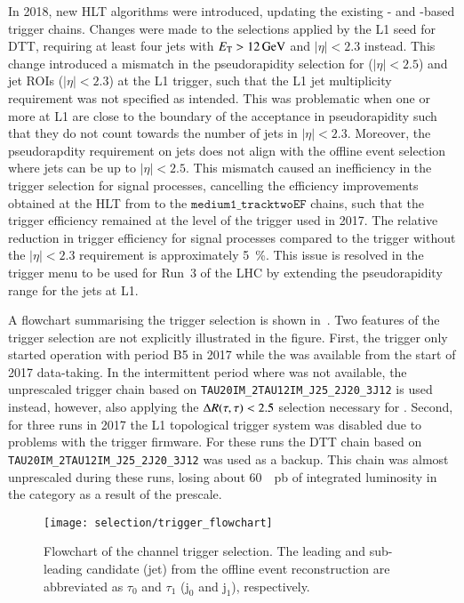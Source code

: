 In 2018, new \tauhadvis HLT algorithms were introduced, updating the
existing \LOneTopo- and \FourJTwelve-based trigger chains. Changes
were made to the selections applied by the \FourJTwelve L1 seed for
DTT, requiring at least four jets with $\ET > \SI{12}{\GeV}$ and
$|\eta| < 2.3$ instead. This change introduced a mismatch in the
pseudorapidity selection for \tauhadvis ($|\eta| < 2.5$) and jet ROIs
($|\eta| < 2.3$) at the L1 trigger, such that the L1 jet multiplicity
requirement was not specified as intended. This was problematic when
one or more \tauhadvis at L1 are close to the boundary of the
acceptance in pseudorapidity such that they do not count towards the
number of jets in $|\eta| < 2.3$. Moreover, the pseudorapdity
requirement on jets does not align with the offline event selection
where jets can be \btagged up to $|\eta| < 2.5$. This mismatch caused
an inefficiency in the trigger selection for signal processes,
cancelling the efficiency improvements obtained at the HLT from to the
$\texttt{medium1\_tracktwoEF}$ chains, such that the trigger
efficiency remained at the level of the \FourJTwelve trigger used in
2017. The relative reduction in trigger efficiency for signal
processes compared to the \FourJTwelve trigger without the
$|\eta| < 2.3$ requirement is approximately \SI{5}{\percent}. This
issue is resolved in the trigger menu to be used for Run~3 of the LHC
by extending the pseudorapidity range for the jets at L1.

A flowchart summarising the trigger selection is shown
in~. Two features of the trigger
selection are not explicitly illustrated in the figure. First, the
\LOneTopo trigger only started operation with period B5 in 2017 while
the \FourJTwelve was available from the start of 2017 data-taking. In
the intermittent period where \LOneTopo was not available, the
unprescaled \tauhadvis trigger chain based on
\texttt{TAU20IM\_2TAU12IM\_J25\_2J20\_3J12} is used instead, however,
also applying the $\Delta R(\tau, \tau) < 2.5$ selection necessary for
\LOneTopo. Second, for three runs in 2017 the L1 topological trigger
system was disabled due to problems with the trigger firmware. For
these runs the DTT chain based on
\texttt{TAU20IM\_2TAU12IM\_J25\_2J20\_3J12} was used as a backup. This
chain was almost unprescaled during these runs, losing about
\SI{60}{\per\pico\barn} of integrated luminosity in the \LOneTopo
category as a result of the prescale.

\begin{figure}[htbp]
  \centering

  \texttt{[image: selection/trigger\_flowchart]}

  \caption{Flowchart of the \hadhad channel trigger selection. The
    leading and sub-leading \tauhadvis candidate (jet) from the
    offline event reconstruction are abbreviated as $\tau_0$ and
    $\tau_1$ ($\text{j}_0$ and $\text{j}_1$), respectively.}%
  \label{fig:trigger_selection_flowchart}
\end{figure}

